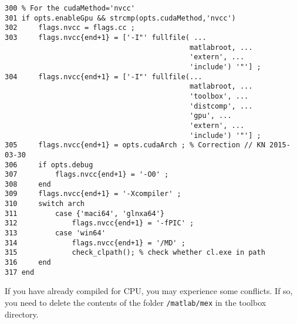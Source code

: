 \documentclass[Main]{subfiles}
\begin{document}
		\begin{lstlisting}[caption=Exerpt from \texttt{vl\_compilenn}, style=Code-Matlab, label=lst:vl_compilenn_exerpt]
300	% For the cudaMethod='nvcc'
301	if opts.enableGpu && strcmp(opts.cudaMethod,'nvcc')
302		flags.nvcc = flags.cc ;
303		flags.nvcc{end+1} = ['-I"' fullfile( ...
											matlabroot, ...
											'extern', ...
											'include') '"'] ;
304		flags.nvcc{end+1} = ['-I"' fullfile(...
											matlabroot, ...
											'toolbox', ...
											'distcomp', ...
											'gpu', ...
											'extern', ...
											'include') '"'] ;
305		flags.nvcc{end+1} = opts.cudaArch ; % Correction // KN 2015-03-30
306		if opts.debug
307			flags.nvcc{end+1} = '-O0' ;
308		end
309		flags.nvcc{end+1} = '-Xcompiler' ;
310		switch arch
311			case {'maci64', 'glnxa64'}
312				flags.nvcc{end+1} = '-fPIC' ;
313			case 'win64'
314				flags.nvcc{end+1} = '/MD' ;
315				check_clpath(); % check whether cl.exe in path
316		end
317	end
			\end{lstlisting}


		If you have already compiled for CPU, you may experience some conflicts.
		If so, you need to delete the contents of the folder \texttt{/matlab/mex} in the toolbox directory.


\end{document}
